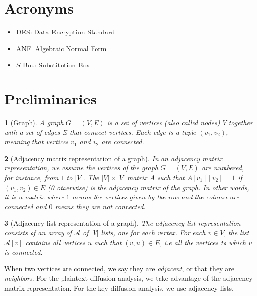 \documentclass{report}
\newtheorem*{concept}{}{\bfseries}{\itshape}
\begin{document}
\section{Acronyms}
\begin{itemize}
    \item DES: Data Encryption Standard
    \item ANF: Algebraic Normal Form
    \item $S$-Box: Substitution Box
\end{itemize}

\section{Preliminaries}\label{sec:prelim}

\begin{concept}[Graph]
A graph $G = (V, E)$ is a set of vertices (also called nodes) $V$ together with a set of edges $E$ that connect vertices. Each edge is a tuple $(v_1, v_2)$, meaning that vertices $v_1$ and $v_2$ are connected.
\end{concept}

\begin{concept}[Adjacency matrix representation of a graph]
In an adjacency matrix representation, we assume the vertices of the graph $G = (V, E)$ are numbered, for instance, from $1$ to $|V|$. The $|V| \times |V|$ matrix $A$ such that $A[v_1][v_2] = 1$ if $(v_1, v_2) \in E$ (0 otherwise) is the adjacency matrix of the graph. In other words, it is a matrix where $1$ means the vertices given by the row and the column are connected and $0$ means they are not connected.
\end{concept}

\begin{concept}[Adjacency-list representation of a graph]
The adjacency-list representation consists of an array of $\mathcal{A}$ of $|V|$ lists, one for each vertex. For each $v \in V$, the list $\mathcal{A}[v]$ contains all vertices $u$ such that $(v, u) \in E$, i.e all the vertices to which $v$ is connected.
\end{concept}

When two vertices are connected, we say they are \emph{adjacent}, or that they are \emph{neighbors}. For the plaintext diffusion analysis, we take advantage of the adjacency matrix representation. For the key diffusion analysis, we use adjacency lists.
\end{document}
